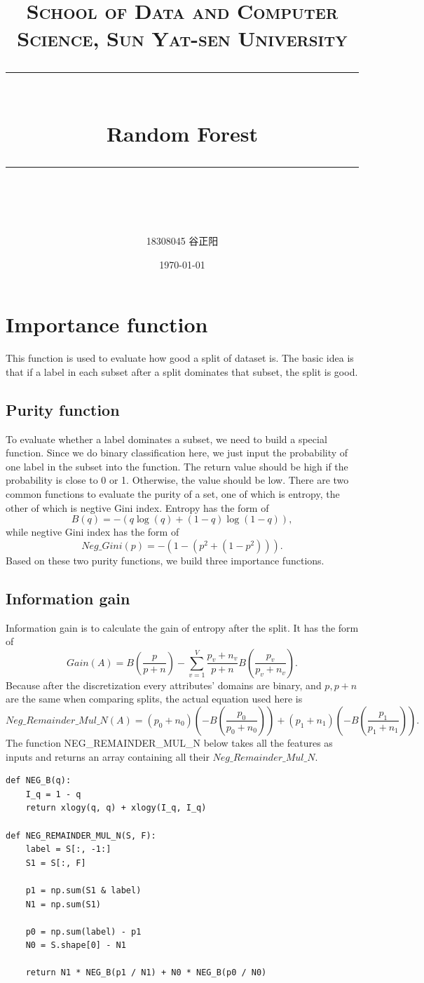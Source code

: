 \documentclass[UTF8, a4paper, 11pt]{article}
\title{	
\normalfont \normalsize
\textsc{School of Data and Computer Science, Sun Yat-sen University} \\ [25pt] %
\rule{\textwidth}{0.5pt} \\[0.4cm] %
\huge Random Forest\\ %
\rule{\textwidth}{2pt} \\[0.5cm] %
\author{18308045 谷正阳}
\date{\normalsize\today}
}
\begin{document}
\maketitle
\tableofcontents
\newpage
\section{Importance function}
This function is used to evaluate how good a split of dataset is.
The basic idea is that if a label in each subset after a split dominates that subset, the split is good.
\subsection{Purity function}
To evaluate whether a label dominates a subset, we need to build a special function.
Since we do binary classification here, we just input the probability of one label in the subset into the function.
The return value should be high if the probability is close to 0 or 1.
Otherwise, the value should be low.
There are two common functions to evaluate the purity of a set, one of which is entropy, the other of which is negtive Gini index.
Entropy has the form of
\begin{equation}
	B(q)=-(q\log(q)+(1-q)\log(1-q)),
\end{equation}
while negtive Gini index has the form of
\begin{equation}
	Neg\_Gini(p)=-(1-(p^2+(1-p^2))).
\end{equation}
Based on these two purity functions, we build three importance functions.
\subsection{Information gain}
Information gain is to calculate the gain of entropy after the split.
It has the form of
\begin{equation}
	Gain(A)=B(\frac p{p+n})-\sum_{v=1}^V\frac{p_v+n_v}{p+n}B(\frac{p_v}{p_v+n_v}).
	\label{eq:gain}
\end{equation}
Because after the discretization every attributes' domains are binary, and $p,p+n$ are the same when comparing splits, the actual equation used here is
\begin{equation}
	Neg\_Remainder\_Mul\_N(A)=(p_0+n_0)(-B(\frac{p_0}{p_0+n_0}))+(p_1+n_1)(-B(\frac{p_1}{p_1+n_1})).
\end{equation}
The function NEG\_REMAINDER\_MUL\_N below takes all the features as inputs and returns an array containing all their $Neg\_Remainder\_Mul\_N$.
\begin{lstlisting}
def NEG_B(q):
    I_q = 1 - q
    return xlogy(q, q) + xlogy(I_q, I_q)

def NEG_REMAINDER_MUL_N(S, F):
    label = S[:, -1:]
    S1 = S[:, F]

    p1 = np.sum(S1 & label)
    N1 = np.sum(S1)

    p0 = np.sum(label) - p1
    N0 = S.shape[0] - N1

    return N1 * NEG_B(p1 / N1) + N0 * NEG_B(p0 / N0)
\end{lstlisting}
\end{document}
